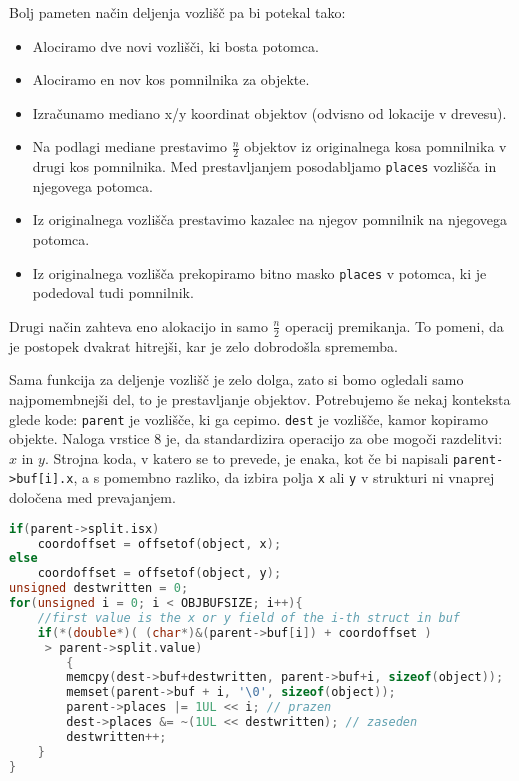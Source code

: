 \documentclass[a4paper,12pt]{article}
\begin{document}
Bolj pameten način deljenja vozlišč pa bi potekal tako:
\begin{itemize}
    \item Alociramo dve novi vozlišči, ki bosta potomca.
    \item Alociramo en nov kos pomnilnika za objekte.
    \item Izračunamo mediano x/y koordinat objektov (odvisno od lokacije v drevesu).
    \item Na podlagi mediane prestavimo $ \frac{n}{2}$ objektov iz originalnega kosa pomnilnika
    v drugi kos pomnilnika. Med prestavljanjem posodabljamo \lstinline|places| vozlišča in njegovega potomca.
    \item Iz originalnega vozlišča prestavimo kazalec na njegov pomnilnik na njegovega potomca.
    \item Iz originalnega vozlišča prekopiramo bitno masko \lstinline|places| v potomca, ki je podedoval tudi pomnilnik.
\end{itemize}
Drugi način zahteva eno alokacijo in samo $\frac{n}{2}$ operacij premikanja. To pomeni, da je postopek
dvakrat hitrejši, kar je zelo dobrodošla sprememba.

Sama funkcija za deljenje vozlišč je zelo dolga, zato si bomo ogledali samo najpomembnejši
del, to je prestavljanje objektov. Potrebujemo še nekaj konteksta glede kode: \lstinline|parent|
je vozlišče, ki ga cepimo. \lstinline|dest| je vozlišče, kamor kopiramo objekte. Naloga vrstice
8 je, da standardizira operacijo za obe mogoči razdelitvi: $x$ in $y$. Strojna koda, v katero se to
prevede, je enaka, kot če bi napisali \lstinline|parent->buf[i].x|, a s pomembno razliko, da izbira
polja \lstinline|x| ali \lstinline|y| v strukturi ni vnaprej določena med prevajanjem.

\begin{lstlisting}[caption={Razdeljevanje objektov med potomcema}, label=balance_buffers, language=C]
if(parent->split.isx) 
    coordoffset = offsetof(object, x);
else 
    coordoffset = offsetof(object, y);
unsigned destwritten = 0;
for(unsigned i = 0; i < OBJBUFSIZE; i++){
    //first value is the x or y field of the i-th struct in buf
    if(*(double*)( (char*)&(parent->buf[i]) + coordoffset )
     > parent->split.value)
        {
        memcpy(dest->buf+destwritten, parent->buf+i, sizeof(object));
        memset(parent->buf + i, '\0', sizeof(object));
        parent->places |= 1UL << i; // prazen
        dest->places &= ~(1UL << destwritten); // zaseden
        destwritten++;
    }
}
\end{lstlisting}
\end{document}
